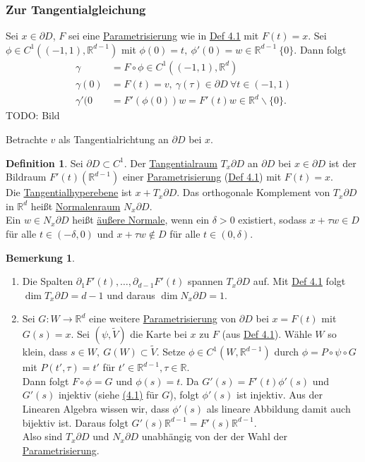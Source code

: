 \documentclass[a4paper]{report}
\newcommand{\R}{\mathbb{R}}
\newcommand{\jlabel}[1]{\label{j_#1}}
\newcommand{\jterm}[1]{\jlabel{#1}\uline{#1}}
\newcommand{\jhyperref}[2]{\hyperref[j_#1]{#2}}
\newcommand{\jlink}[1]{\jhyperref{#1}{#1}}
\newcommand{\jabb}[3]{ #1: #2 \rightarrow #3 }
\newcommand{\jspace}{\vspace{8pt}}
\theoremstyle{plain}
\theoremstyle{definition}
\newtheorem{defn}[thm]{Definition}
\newtheorem{bem}[thm]{Bemerkung}
\begin{document}
{{{{\subsubsection*{Zur Tangentialgleichung}

Sei $x\in \partial D$, $F$ sei eine \jlink{Parametrisierung} wie in \jlink{Def 4.1} mit $F(t) = x$. Sei $\phi \in C^1((-1,1), \R^{d-1})$ mit $\phi(0) = t, \ \phi'(0) = w \in \R^{d-1} \ \{0\}$. Dann folgt
\[
    \begin{split}
        \gamma &= F \circ \phi \in C^1((-1,1), \R^d)\\
        \gamma(0) &= F(t) = v, \ \gamma(\tau) \in \partial D \ \forall t \in (-1,1)\\
        \gamma'(0 &= F'(\phi(0))w = F'(t)w \in \R^d \backslash \{0\}.
    \end{split}
\]
TODO: Bild

\jspace

Betrachte $v$ als Tangentialrichtung an $\partial D$ bei $x$.

\begin{defn}
    \jlabel{Def 4.4}
    Sei $\partial D \subset C^1$. Der \jterm{Tangentialraum} $T_x\partial D$ an $\partial D$ bei $x \in \partial D$ ist der Bildraum $F'(t)(\R^{d-1})$ einer \jlink{Parametrisierung} (\jlink{Def 4.1}) mit $F(t) = x$.\\
    Die \jterm{Tangentialhyperebene} ist $x + T_x\partial D$. Das orthogonale Komplement von $T_x\partial D$ in $\R^d$ heißt \jterm{Normalenraum} $N_x\partial D$.\\
    Ein $w \in N_x\partial D$ heißt \uline{äußere Normale}, wenn ein $\delta > 0$ existiert, sodass $x + \tau w \in D$ für alle $t\in (-\delta, 0)$ und $x + \tau w \notin D$ für alle $t\in (0, \delta)$.
\end{defn}

\jlabel{Bem 4.5}
\begin{bem}
    \begin{enumerate}
        \item Die Spalten $\partial_1 F'(t), \dots, \partial_{d-1} F'(t)$ spannen $T_x\partial D$ auf. Mit \jlink{Def 4.1} folgt $\dim T_x\partial D = d-1$ und daraus $\dim N_x\partial D = 1$.
        
        \item Sei $\jabb{G}{W}{\R^d}$ eine weitere \jlink{Parametrisierung} von $\partial D$ bei $x = F(t)$ mit $G(s) =x$. Sei $(\psi, \tilde{V})$ die Karte bei $x$ zu $F$ (aus \jlink{Def 4.1}). Wähle $W$ so klein, dass $s\in W,\ G(W) \subset \tilde{V}$. Setze $\phi \in C^1(W, \R^{d-1})$ durch $\phi = P \circ \psi \circ G$ mit $P(t', \tau)=t'$ für $t' \in \R^{d-1}, \tau\in \R$.\\
        Dann folgt $F \circ \phi = G$ und $\phi(s)=t$. Da $G'(s) = F'(t)\phi'(s)$ und $G'(s)$ injektiv (siehe \jlink{(4.1)} für $G$), folgt $\phi'(s)$ ist injektiv. Aus der Linearen Algebra wissen wir, dass $\phi'(s)$ als lineare Abbildung damit auch bijektiv ist. Daraus folgt $G'(s)\R^{d-1} = F'(s)\R^{d-1}$.\\
        Also sind $T_x\partial D$ und $N_x\partial D$ unabhängig von der der Wahl der \jlink{Parametrisierung}.
    \end{enumerate}
\end{bem}

}}}}
\end{document}
